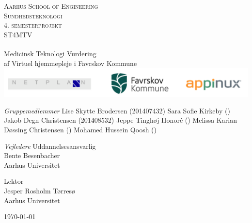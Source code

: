 \begin{titlingpage}
\begin{center}


\textsc{\LARGE Aarhus School of Engineering}\\[1cm]

\textsc{\Large Sundhedsteknologi}\\
\textsc{\Large 4. semesterprojekt}\\
\textsc{\Large ST4MTV}\\[0.5cm]

\noindent\makebox[\linewidth]{\rule{\textwidth}{0.4pt}}\\
[0.5cm]{\Huge Medicinsk Teknologi Vurdering}\\
{af Virtuel hjemmepleje i Favrskov Kommune}
\noindent\makebox[\linewidth]{\rule{\textwidth}{0.4pt}}\\[1cm]


\includegraphics[width=1\textwidth]{Figurer/Snip20160407_38}\\[1.5cm]

\end{center}

\textit{Gruppemedlemmer} \newline
Lise Skytte Brodersen (201407432) \newline
Sara Sofie Kirkeby () \newline
Jakob Degn Christensen (201408532) \newline
Jeppe Tinghøj Honoré () \newline		 
Melissa Karian Døssing Christensen () \newline 
Mohamed Hussein Qoosh () \newline

\textit{Vejledere} \newline
Uddannelsesansvarlig\\
Bente Besenbacher\\
Aarhus Universitet

Lektor\\
Jesper Rosholm Tørresø\\
Aarhus Universitet

\vfill

\begin{center}
{\large \today}
\end{center}


\end{titlingpage}